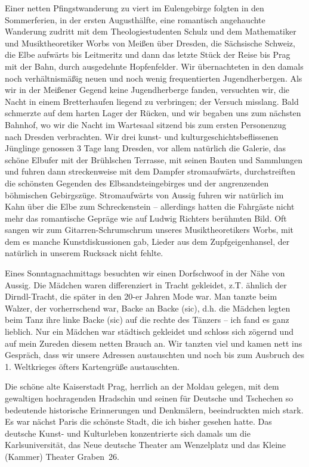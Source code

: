 \documentclass[a5paper,pagesize,10pt,twoside=true]{scrbook}
\renewcommand{\marginpar}[2][]{}
\begin{document}
\marginpar{153}
Einer netten Pfingstwanderung zu viert im Eulengebirge folgten in den Sommerferien, in der ersten Augusthälfte, eine romantisch angehauchte Wanderung zudritt mit dem Theologiestudenten Schulz und dem Mathematiker und Musiktheoretiker Worbs von Meißen über Dresden, die Sächsische Schweiz, die Elbe aufwärts bis Leitmeritz und dann das letzte Stück der Reise bis Prag mit der Bahn, durch ausgedehnte Hopfenfelder. Wir übernachteten in den damals noch verhältnismäßig neuen und noch wenig frequentierten Jugendherbergen. Als wir in der Meißener Gegend keine Jugendherberge fanden, versuchten wir, die Nacht in einem Bretterhaufen liegend zu verbringen; der Versuch misslang. Bald schmerzte auf dem harten Lager der Rücken, und wir begaben uns zum nächsten Bahnhof, wo wir die Nacht im Wartesaal sitzend bis zum ersten Personenzug nach Dresden verbrachten. Wir drei kunst- und kulturgeschichtsbeflissenen Jünglinge genossen 3 Tage lang Dresden, vor allem natürlich die Galerie, das schöne Elbufer mit der Brühlschen Terrasse, mit seinen Bauten und Sammlungen und fuhren dann streckenweise mit dem Dampfer stromaufwärts, durchstreiften die schönsten Gegenden des Elbsandsteingebirges und der angrenzenden böhmischen Gebirgszüge. Stromaufwärts von Aussig fuhren wir natürlich im Kahn über die Elbe zum Schreckenstein -- allerdings hatten die Fahrgäste nicht mehr das romantische Gepräge wie auf Ludwig Richters berühmten Bild. Oft sangen wir zum Gitarren-Schrumschrum unseres Musiktheoretikers Worbs, mit dem es manche Kunstdiskussionen gab, Lieder aus dem Zupfgeigenhansel, der natürlich in unserem Rucksack nicht fehlte.

Eines Sonntagnachmittags besuchten wir einen Dorfschwoof in der Nähe von Aussig. Die Mädchen waren differenziert in Tracht gekleidet, z.T. ähnlich der Dirndl-Tracht, die später in den 20-er Jahren Mode war. Man tanzte beim Walzer, der vorherrschend war, Backe an Backe (sic), d.h. die Mädchen legten beim Tanz ihre linke Backe (sic) auf die rechte des Tänzers -- ich fand es ganz lieblich. Nur ein Mädchen war städtisch gekleidet und schloss sich zögernd und auf mein Zureden diesem netten Brauch an. Wir tanzten viel und kamen nett ins Gespräch, dass wir unsere Adressen austauschten und noch bis zum Ausbruch des 1. Weltkrieges öfters Kartengrüße austauschten.

Die schöne alte Kaiserstadt Prag, herrlich an der Moldau gelegen, mit dem gewaltigen hochragenden Hradschin und seinen für Deutsche und Tschechen so bedeutende historische Erinnerungen und Denkmälern, beeindruckten mich stark. Es war nächst Paris die schönste Stadt, die ich bisher gesehen hatte. Das deutsche Kunst- und Kulturleben konzentrierte sich damals um die Karlsuniversität, das Neue deutsche Theater am Wenzelplatz und das Kleine (Kammer) Theater Graben~26.
\end{document}
